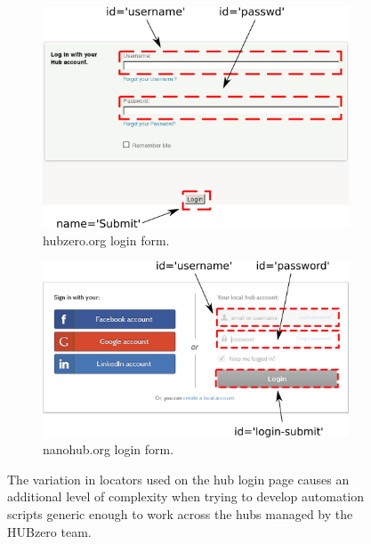 \begin{figure}[ht!]
        \centering
        \begin{subfigure}[b]{0.4\textwidth}
                \centering
                \includegraphics[width=\textwidth]
                  {../../images/hubzero_login_form_with_locators.png}
                \caption{ hubzero.org login form. }
                \label{fig:login_form_with_locators_hubzero}
        \end{subfigure}
        \begin{subfigure}[b]{0.4\textwidth}
                \centering
                \includegraphics[width=\textwidth]
                  {../../images/nanohub_login_form_with_locators.png}
                \caption{ nanohub.org login form. }
                \label{fig:login_form_with_locators_nanohub}
        \end{subfigure}
        \caption{The variation in locators used on the hub login page causes an
                 additional level of complexity when trying to develop automation
                 scripts generic enough to work across the hubs managed by the
                 HUBzero team.}
        \label{fig:login_form_locators}
\end{figure}

